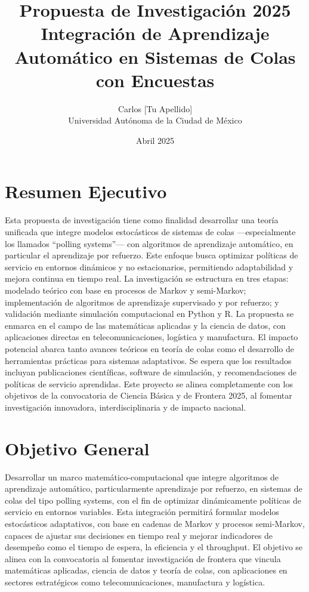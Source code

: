 \documentclass[12pt]{article}
\title{Propuesta de Investigación 2025\\Integración de Aprendizaje Automático en Sistemas de Colas con Encuestas}
\author{Carlos [Tu Apellido]\\Universidad Autónoma de la Ciudad de México}
\date{Abril 2025}
\begin{document}
\maketitle

\section*{Resumen Ejecutivo}
Esta propuesta de investigación tiene como finalidad desarrollar una teoría unificada que integre modelos estocásticos de sistemas de colas —especialmente los llamados “polling systems”— con algoritmos de aprendizaje automático, en particular el aprendizaje por refuerzo. Este enfoque busca optimizar políticas de servicio en entornos dinámicos y no estacionarios, permitiendo adaptabilidad y mejora continua en tiempo real. La investigación se estructura en tres etapas: modelado teórico con base en procesos de Markov y semi-Markov; implementación de algoritmos de aprendizaje supervisado y por refuerzo; y validación mediante simulación computacional en Python y R. La propuesta se enmarca en el campo de las matemáticas aplicadas y la ciencia de datos, con aplicaciones directas en telecomunicaciones, logística y manufactura. El impacto potencial abarca tanto avances teóricos en teoría de colas como el desarrollo de herramientas prácticas para sistemas adaptativos. Se espera que los resultados incluyan publicaciones científicas, software de simulación, y recomendaciones de políticas de servicio aprendidas. Este proyecto se alinea completamente con los objetivos de la convocatoria de Ciencia Básica y de Frontera 2025, al fomentar investigación innovadora, interdisciplinaria y de impacto nacional.

\section*{Objetivo General}
Desarrollar un marco matemático-computacional que integre algoritmos de aprendizaje automático, particularmente aprendizaje por refuerzo, en sistemas de colas del tipo polling systems, con el fin de optimizar dinámicamente políticas de servicio en entornos variables. Esta integración permitirá formular modelos estocásticos adaptativos, con base en cadenas de Markov y procesos semi-Markov, capaces de ajustar sus decisiones en tiempo real y mejorar indicadores de desempeño como el tiempo de espera, la eficiencia y el throughput. El objetivo se alinea con la convocatoria al fomentar investigación de frontera que vincula matemáticas aplicadas, ciencia de datos y teoría de colas, con aplicaciones en sectores estratégicos como telecomunicaciones, manufactura y logística.
\end{document}
